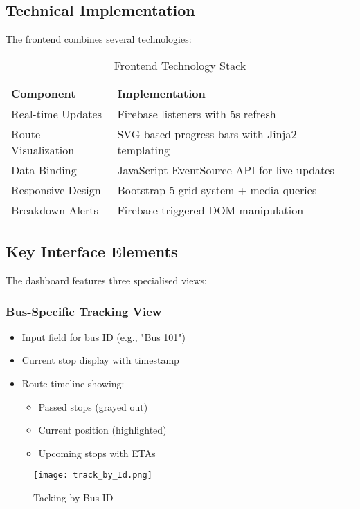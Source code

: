 \documentclass{article}
\begin{document}
\begin{multicols}{2}
\subsection{Technical Implementation}
The frontend combines several technologies:

\begin{table}[H]
\centering
\caption{Frontend Technology Stack}
\label{tab:frontend}
\begin{tabular}{p{3.5cm}p{3.5cm}}
\toprule
\textbf{Component} & \textbf{Implementation} \\
\midrule
Real-time Updates & Firebase listeners with 5s refresh \\
Route Visualization & SVG-based progress bars with Jinja2 templating \\
Data Binding & JavaScript EventSource API for live updates \\
Responsive Design & Bootstrap 5 grid system + media queries \\
Breakdown Alerts & Firebase-triggered DOM manipulation \\
\bottomrule
\end{tabular}
\end{table}

\subsection{Key Interface Elements}
The dashboard features three specialised views:

\subsubsection{Bus-Specific Tracking View}
\begin{itemize}
\item Input field for bus ID (e.g., "Bus 101")
\item Current stop display with timestamp
\item Route timeline showing:
\begin{itemize}
\item Passed stops (grayed out)
\item Current position (highlighted)
\item Upcoming stops with ETAs
\end{itemize}
\end{itemize}

\begin{figure}[H]
\centering
\texttt{[image: track\_by\_Id.png]}
\caption{Tacking by Bus ID}
\label{fig:component1}
\end{figure}


\end{multicols}
\end{document}

